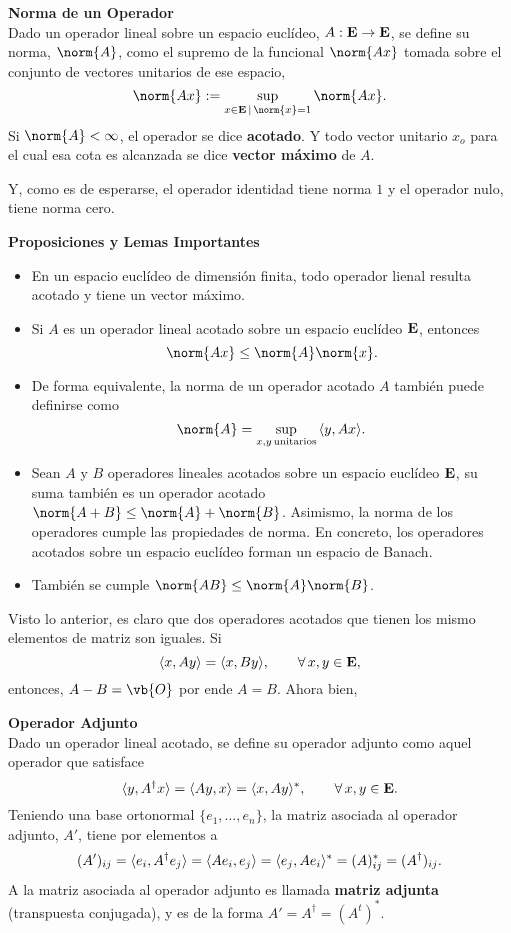 \begin{mdframed}[style=warning]
	{\large \textbf{Norma de un Operador}} \\
	Dado un operador lineal sobre un espacio euclídeo, $A: \mathbf{E} \to \mathbf{E}$, se define su norma, $\norm{A}$, como el supremo de la funcional $\norm{Ax}$ tomada sobre el conjunto de vectores unitarios de ese espacio,
		$$ \norm{Ax} := \sup _{x\in \E \, | \, \norm{x} = 1} {\norm{Ax}}. $$
	Si $\norm{A} < \infty$, el operador se dice \textbf{acotado}. Y todo vector unitario $x_o$ para el cual esa cota es alcanzada se dice \textbf{vector máximo} de $A$.
\end{mdframed}

Y, como es de esperarse, el operador identidad tiene norma $1$ y el operador nulo, tiene norma cero.

\begin{mdframed}[style=warning]
	{\large \textbf{Proposiciones y Lemas Importantes}} \\
	\begin{itemize}
		\item En un espacio euclídeo de dimensión finita, todo operador lienal resulta acotado y tiene un vector máximo.
		\item Si $A$ es un operador lineal acotado sobre un espacio euclídeo $\mathbf{E}$, entonces
			$$ \norm{Ax} \leq \norm{A} \norm{x}. $$
		\item De forma equivalente, la norma de un operador acotado $A$ también puede definirse como
			$$ \norm{A} = \sup _{x,y \, \text{unitarios}} {\inner{y}{Ax}}. $$
		\item Sean $A$ y $B$ operadores lineales acotados sobre un espacio euclídeo $\mathbf{E}$, su suma también es un operador acotado $\norm{A + B} \leq \norm{A} + \norm{B}$. Asimismo, la norma de los operadores cumple las propiedades de norma. En concreto, los operadores acotados sobre un espacio euclídeo forman un espacio de Banach.
		\item También se cumple $\norm{AB} \leq \norm{A} \norm{B}$.
	\end{itemize}
\end{mdframed}


Visto lo anterior, es claro que dos operadores acotados que tienen los mismo elementos de matriz son iguales. Si
	$$ \langle x , Ay \rangle = \langle x , By \rangle, \qquad \forall \, x,y\in \mathbf{E} , $$
entonces, $A-B = \vb{O}$ por ende $A = B$. Ahora bien,

\begin{mdframed}[style=warning]
	{\large \textbf{Operador Adjunto}} \\
	Dado un operador lineal acotado, se define su operador adjunto como aquel operador que satisface
		$$ \langle y , A^\dagger x \rangle = \langle Ay , x \rangle = \langle x , Ay \rangle ^*,\qquad \forall \, x,y \in \mathbf{E} . $$
	Teniendo una base ortonormal $\{ e_1,\ldots ,e_n \}$, la matriz asociada al operador adjunto, $A'$, tiene por elementos a
		$$ (A')_{ij} = \langle e_i , A^\dagger e_j \rangle = \langle Ae_i , e_j \rangle = \langle e_j , Ae_i \rangle ^* = (A)_{ij} ^* = (A^\dagger)_{ij}. $$
	A la matriz asociada al operador adjunto es llamada \textbf{matriz adjunta} (transpuesta conjugada), y es de la forma $A' = A^\dagger = (A^t)^*$.
\end{mdframed}




